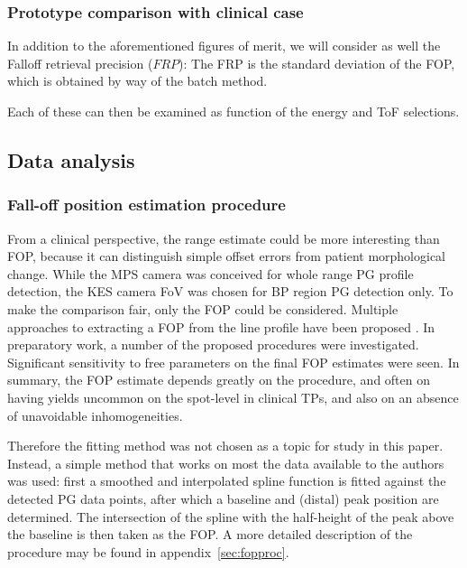 \documentclass[a4paper,english]{article}
\begin{document}
\subsubsection{Prototype comparison with clinical case}

In addition to the aforementioned figures of merit, we will consider as well the Falloff retrieval precision ($FRP$): The FRP is the standard deviation of the FOP, which is obtained by way of the batch method.

Each of these can then be examined as function of the energy and ToF selections.


\subsection{Data analysis}

\subsubsection{Fall-off position estimation procedure}

From a clinical perspective, the range estimate could be more interesting than FOP, because it can distinguish simple offset errors from patient morphological change. While the MPS camera was conceived for whole range PG profile detection, the KES camera FoV was chosen for BP region PG detection only. To make the comparison fair, only the FOP could be considered. Multiple approaches to extracting a FOP from the line profile have been proposed \citep{Smeets2012,Gueth2013,Roellinghoff2014a,Janssen2014,Sterpin2015}. In preparatory work, a number of the proposed procedures were investigated. Significant sensitivity to free parameters on the final FOP estimates were seen. In summary, the FOP estimate depends greatly on the procedure, and often on having yields uncommon on the spot-level in clinical TPs, and also on an absence of unavoidable inhomogeneities.

Therefore the fitting method was not chosen as a topic for study in this paper. Instead, a simple method that works on most the data available to the authors was used: first a smoothed and interpolated spline function is fitted against the detected PG data points, after which a baseline and (distal) peak position are determined. The intersection of the spline with the half-height of the peak above the baseline is then taken as the FOP. A more detailed description of the procedure may be found in appendix~\ref{sec:fopproc}.
\end{document}

